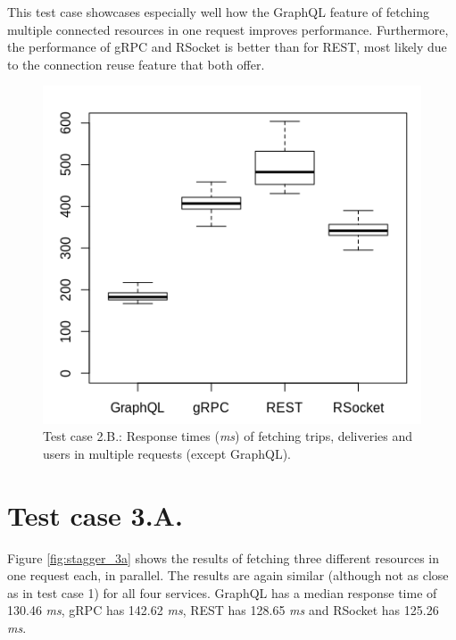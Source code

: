 This test case showcases especially well how the GraphQL feature of fetching multiple connected resources in one request improves performance. Furthermore, the performance of gRPC and RSocket is better than for REST, most likely due to the connection reuse feature that both offer.

\begin{figure}[ht!]
    \centerline{\includegraphics[scale=0.7]{thesis_svava/images/stagger2bnew.png}}
    \caption{Test case 2.B.: Response times (\textit{ms}) of fetching trips, deliveries and users in multiple requests (except GraphQL).}
    \label{fig:stagger_2b}
\end{figure}

\section{Test case 3.A.}
Figure \ref{fig:stagger_3a} shows the results of fetching three different resources in one request each, in parallel. The results are again similar (although not as close as in test case 1) for all four services. GraphQL has a median response time of 130.46 \textit{ms}, gRPC has 142.62 \textit{ms}, REST has 128.65 \textit{ms} and RSocket has 125.26 \textit{ms}.

